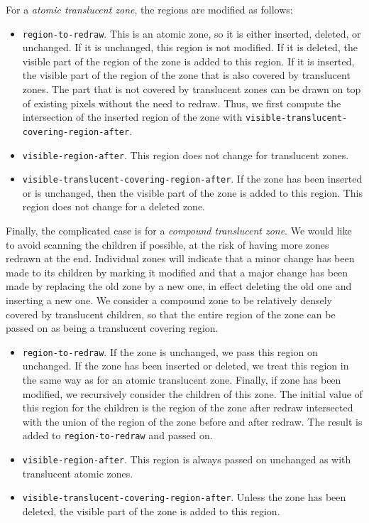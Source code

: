 \documentclass{report}
\begin{document}
For a \emph{atomic translucent zone}, the regions are modified as
follows:

\begin{itemize}
\item \texttt{region-to-redraw}.  This is an atomic zone, so it is
  either inserted, deleted, or unchanged.  If it is unchanged,
  this region is not modified.  If it is deleted, the
  visible part of the region of the zone is added to this region.
  If it is inserted, the visible part of the region of the zone that
  is also covered by translucent zones.  The part that is not
  covered by translucent zones can be drawn on top of existing
  pixels without the need to redraw.  Thus,
  we first compute the intersection of the inserted region of the zone
  with \texttt{visible-translucent-covering-region-after}.
\item \texttt{visible-region-after}.  This region does not change for
  translucent zones. 
\item \texttt{visible-translucent-covering-region-after}.  If the
  zone has been inserted or is unchanged, then the visible
  part of the zone is added to this region.  This region does not
  change for a deleted zone.
\end{itemize}

Finally, the complicated case is for a \emph{compound translucent
  zone}.  We would like to avoid scanning the children if possible,
  at the risk of having more zones redrawn at the end.  Individual
  zones will indicate that a minor change has been made to its
  children by marking it modified and that a major change has been
  made by replacing the old zone by a new one, in effect deleting
  the old one and inserting a new one.  We consider a compound zone
  to be relatively densely covered by translucent children, so that
  the entire region of the zone can be passed on as being a
  translucent covering region.

\begin{itemize}
\item \texttt{region-to-redraw}.  If the zone is unchanged, we pass
  this region on unchanged.  If the zone has been inserted or
  deleted, we treat this region in the same way as for an atomic
  translucent zone.  Finally, if zone has been modified, we
  recursively consider the children of this zone.  The initial value
  of this region for the children is the region of the zone after
  redraw intersected with the union of the region of the zone
  before and after redraw.  The result is added to
  \texttt{region-to-redraw} and passed on.
\item \texttt{visible-region-after}.  This region is always passed on
  unchanged as with translucent atomic zones. 
\item \texttt{visible-translucent-covering-region-after}.  Unless the
  zone has been deleted, the visible part of the zone is added to
  this region.
\end{itemize}
\end{document}
